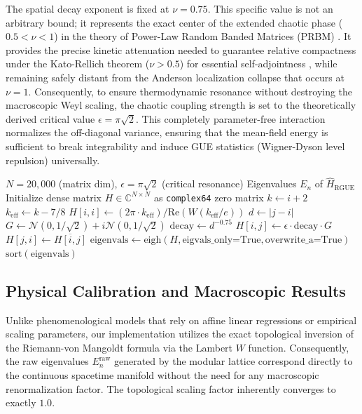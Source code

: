 \documentclass[aps,prl,preprint,superscriptaddress,floatfix]{revtex4-2}
\begin{document}
The spatial decay exponent is fixed at $\nu = 0.75$. This specific value is not an arbitrary bound; it represents the exact center of the extended chaotic phase ($0.5 < \nu < 1$) in the theory of Power-Law Random Banded Matrices (PRBM) \cite{Mirlin1996}. It provides the precise kinetic attenuation needed to guarantee relative compactness under the Kato-Rellich theorem ($\nu > 0.5$) for essential self-adjointness \cite{ReedSimon1975}, while remaining safely distant from the Anderson localization collapse that occurs at $\nu = 1$. Consequently, to ensure thermodynamic resonance without destroying the macroscopic Weyl scaling, the chaotic coupling strength is set to the theoretically derived critical value $\epsilon = \pi \sqrt{2}$. This completely parameter-free interaction normalizes the off-diagonal variance, ensuring that the mean-field energy is sufficient to break integrability and induce GUE statistics (Wigner-Dyson level repulsion) universally.

\begin{algorithm}[H]
\caption{Parameter-Free Riemann-GUE Ensemble Generation}
\label{alg:hamiltonian}
\begin{algorithmic}
\Require $N=20,000$ (matrix dim), $\epsilon=\pi\sqrt{2}$ (critical resonance)
\Ensure Eigenvalues $E_n$ of $\hat{H}_{\text{RGUE}}$
\State Initialize dense matrix $H \in \mathbb{C}^{N \times N}$ as \texttt{complex64} zero matrix
    \State $k \gets i+2$
    \State $k_{\text{eff}} \gets k - 7/8$ 
    \State $H[i,i] \gets (2\pi \cdot k_{\text{eff}}) / \text{Re}(W(k_{\text{eff}}/e))$ 
        \State $d \gets |j-i|$
         
            \State $G \gets \mathcal{N}(0, 1/\sqrt{2}) + i\mathcal{N}(0, 1/\sqrt{2})$ 
            \State $\text{decay} \gets d^{-0.75}$ 
            \State $H[i,j] \gets \epsilon \cdot \text{decay} \cdot G$
            \State $H[j,i] \gets \overline{H[i,j]}$ 
        \EndIf
    \EndFor
\EndFor
\State $\text{eigenvals} \gets \text{eigh}(H, \text{eigvals\_only=True}, \text{overwrite\_a=True})$
\State \Return $\text{sort}(\text{eigenvals})$
\end{algorithmic}
\end{algorithm}

\subsection{Physical Calibration and Macroscopic Results}
Unlike phenomenological models that rely on affine linear regressions or empirical scaling parameters, our implementation utilizes the exact topological inversion of the Riemann-von Mangoldt formula via the Lambert $W$ function. Consequently, the raw eigenvalues $E_n^{\text{raw}}$ generated by the modular lattice correspond directly to the continuous spacetime manifold without the need for any macroscopic renormalization factor. The topological scaling factor inherently converges to exactly $1.0$.
\end{document}
